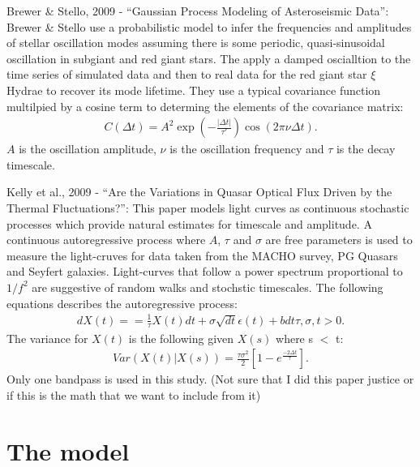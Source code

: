 \documentclass[letterpaper,12pt,preprint]{aastex}
\begin{document}
Brewer \& Stello, 2009 - ``Gaussian Process Modeling of Asteroseismic
Data'': Brewer \& Stello use a probabilistic model to infer the
frequencies and amplitudes of stellar oscillation modes assuming there
is some periodic, quasi-sinusoidal oscillation in subgiant and red
giant stars. The apply a damped oscialltion to the time series of
simulated data and then to real data for the red giant star $\xi$
Hydrae to recover its mode lifetime. They use a typical covariance
function multilpied by a cosine term to determing the elements of the
covariance matrix:
\begin{eqnarray}
C(\Delta t)= A^2 \exp \left( -\frac{|\Delta t|}{\tau'}\right ) \cos (2
\pi \nu \Delta t).
\end{eqnarray}
$A$ is the oscillation amplitude, $\nu$ is the oscillation frequency
and $\tau$ is the decay timescale.

Kelly et al., 2009 - ``Are the Variations in Quasar Optical Flux
Driven by the Thermal Fluctuations?'': This paper models light curves
as continuous stochastic processes which provide natural estimates for
timescale and amplitude. A continuous autoregressive process where
$A$, $\tau$ and $\sigma$ are free parameters is used to measure the
light-cruves for data taken from the MACHO survey, PG Quasars and
Seyfert galaxies. Light-curves that follow a power spectrum
proportional to $1/f^2$ are suggestive of random walks and stochstic
timescales. The following equations describes the autoregressive
process:
\begin{eqnarray}
dX(t)==\frac{1}{\tau}X(t)dt + \sigma\sqrt{dt}\epsilon(t)+bdt
\tau,\sigma,t > 0.
\end{eqnarray}
The variance for $X(t)$ is the following given $X(s)$ where s $<$ t:
\begin{eqnarray}
Var(X(t)|X(s))=\frac{\tau \sigma^2}{2}\left [ 1-e^\frac{-2\Delta
    t}{\tau}\right].
\end{eqnarray}
Only one bandpass is used in this study. (Not sure that I did this
paper justice or if this is the math that we want to include from it)

\section{The model}
\end{document}
